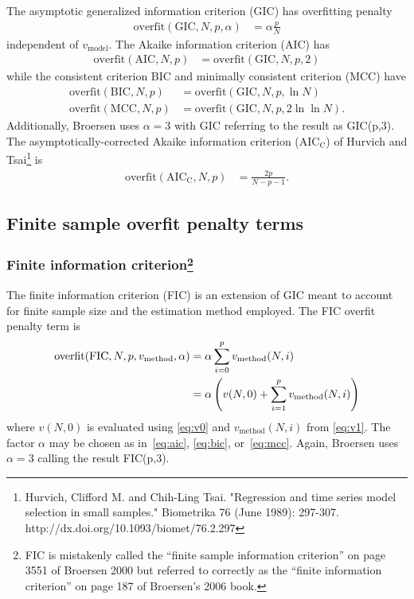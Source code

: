 \documentclass[12pt,letterpaper]{article}
\begin{document}
The asymptotic generalized information criterion (GIC) has overfitting penalty
\begin{align}
    \text{overfit}\!\left(\text{GIC},N,p,\alpha\right)
    &=
    \alpha \frac{p}{N}
\end{align}
independent of $v_\text{model}$.  The Akaike information criterion
(AIC) has
\begin{align}
    \label{eq:aic}
    \text{overfit}\!\left(\text{AIC},N,p\right)
    &=
    \text{overfit}\!\left(\text{GIC},N,p,2\right)
\end{align}
while the consistent criterion BIC and minimally consistent criterion
(MCC) have
\begin{align}
    \label{eq:bic}
    \text{overfit}\!\left(\text{BIC},N,p\right)
    &=
    \text{overfit}\!\left(\text{GIC},N,p,\ln{} N\right)
    \\
    \label{eq:mcc}
    \text{overfit}\!\left(\text{MCC},N,p\right)
    &=
    \text{overfit}\!\left(\text{GIC},N,p,2\ln\ln{}N\right)
    .
\end{align}
Additionally, Broersen uses $\alpha = 3$ with GIC referring to the result as
GIC(p,3).  The asymptotically-corrected Akaike information criterion
($\text{AIC}_\text{C}$) of Hurvich and Tsai\footnote{Hurvich, Clifford M. and
Chih-Ling Tsai. "Regression and time series model selection in small samples."
Biometrika 76 (June 1989): 297-307.  http://dx.doi.org/10.1093/biomet/76.2.297}
is
\begin{align}
    \text{overfit}\!\left(\text{AIC}_\text{C},N,p\right)
    &=
    \frac{2p}{N-p-1}
    .
\end{align}

\subsection*{Finite sample overfit penalty terms}

\subsubsection*{Finite information criterion\footnote{FIC is mistakenly called
the ``finite sample information criterion'' on page 3551 of Broersen 2000 but
referred to correctly as the ``finite information criterion'' on page 187 of
Broersen's 2006 book.}}

The finite information criterion (FIC) is an extension of GIC meant to account
for finite sample size and the estimation method employed.  The FIC overfit
penalty term is
\begin{align}
    \text{overfit}\!\left(\text{FIC},N,p,v_\text{method},\alpha\right)
    &=
    \alpha \sum_{i=0}^{p} v_\text{method}\!\left(N,i\right)
    \notag
    \\
    &=
    \alpha\left(
      v\!\left(N,0\right)
    + \sum_{i=1}^{p} v_\text{method}\!\left(N,i\right)
    \right)
\end{align}
where $v\!\left(N,0\right)$ is evaluated using \eqref{eq:v0} and
$v_\text{method}\!\left(N,i\right)$ from \eqref{eq:v1}.  The factor $\alpha$
may be chosen as in~\eqref{eq:aic}, \eqref{eq:bic}, or~\eqref{eq:mcc}.  Again,
Broersen uses $\alpha = 3$ calling the result FIC(p,3).
\end{document}
